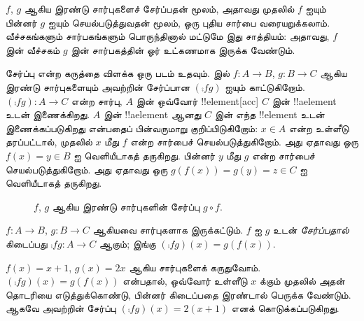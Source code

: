 \documentclass[../../../include/open-logic-section]{subfiles}
\begin{document}

\begin{explain}
$f$, $g$ ஆகிய இரண்டு சார்புகளைச் சேர்ப்பதன் மூலம்,
அதாவது முதலில் $f$ ஐயும் பின்னர் $g$ ஐயும் செயல்படுத்துவதன் மூலம்,
ஒரு புதிய சார்பை வரையறுக்கலாம்.
வீச்சகங்களும் சார்பகங்களும் பொருந்தினால் மட்டுமே இது சாத்தியம்:
அதாவது, $f$ இன் வீச்சகம் $g$ இன் சார்பகத்தின் ஓர் உட்கணமாக
இருக்க வேண்டும்.

சேர்ப்பு என்ற கருத்தை விளக்க ஒரு படம் உதவும்.
 இல் $f \colon A \to B$,
$g \colon B \to C$ ஆகிய இரண்டு சார்புகளையும் அவற்றின்
சேர்ப்பான $(\comp{f}{g})$ ஐயும் காட்டுகிறோம்.
$(\comp{f}{g}) \colon A \to C$ என்ற சார்பு,
$A$ இன் ஒவ்வோர் !!{element}[acc] $C$ இன் !!a{element} உடன்
இணைக்கிறது. $A$ இன் !!a{element} ஆனது $C$ இன் எந்த
!!{element} உடன் இணைக்கப்படுகிறது என்பதைப் பின்வருமாறு
குறிப்பிடுகிறோம்: $x \in
A$ என்ற உள்ளீடு தரப்பட்டால், முதலில் $x$ மீது $f$ என்ற
சார்பைச் செயல்படுத்துகிறோம். அது ஏதாவது ஒரு
$f(x)
= y \in B$ ஐ வெளியீடாகத் தருகிறது.
பின்னர் $y$ மீது $g$ என்ற சார்பைச் செயல்படுத்துகிறோம்.
அது ஏதாவது ஒரு $g(f(x)) = g(y) = z \in C$ ஐ வெளியீடாகத் தருகிறது.
\begin{figure}
  \caption{$f$, $g$ ஆகிய இரண்டு சார்புகளின் சேர்ப்பு $g \circ f$.}
\end{figure}
\end{explain}

\begin{defn}[சேர்ப்பு]
$f\colon A \to B$, $g\colon B \to C$ ஆகியவை சார்புகளாக இருக்கட்டும்.
$f$ ஐ $g$ உடன் \emph{சேர்ப்பதால்} கிடைப்பது
$\comp{f}{g} \colon A \to C$ ஆகும்;
இங்கு $(\comp{f}{g})(x) = g(f(x))$.
\end{defn}

\begin{ex}
$f(x) = x + 1$, $g(x) = 2x$ ஆகிய சார்புகளைக் கருதுவோம்.
$(\comp{f}{g})(x) = g(f(x))$ என்பதால்,
ஒவ்வோர் உள்ளீடு $x$ க்கும் முதலில் அதன் தொடரியை எடுத்துக்கொண்டு,
பின்னர் கிடைப்பதை இரண்டால் பெருக்க வேண்டும்.
ஆகவே அவற்றின் சேர்ப்பு $(\comp{f}{g})(x) = 2(x+1)$ எனக்
கொடுக்கப்படுகிறது.
\end{ex}
\end{document}
